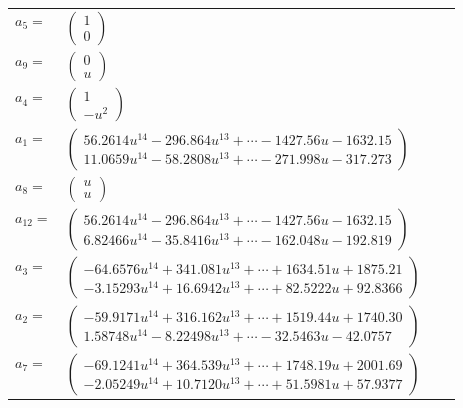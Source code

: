 \documentclass[1p]{elsarticle_modified}
\theoremstyle{definition}
\begin{document}
\begin{tabular}{m{7pt} m{180pt} m{7pt} m{180pt} }
\flushright $a_{5}=$&$\begin{pmatrix}1\\0\end{pmatrix}$ \\
\flushright $a_{9}=$&$\begin{pmatrix}0\\u\end{pmatrix}$ \\
\flushright $a_{4}=$&$\begin{pmatrix}1\\- u^2\end{pmatrix}$ \\
\flushright $a_{1}=$&$\begin{pmatrix}56.2614 u^{14}-296.864 u^{13}+\cdots-1427.56 u-1632.15\\11.0659 u^{14}-58.2808 u^{13}+\cdots-271.998 u-317.273\end{pmatrix}$ \\
\flushright $a_{8}=$&$\begin{pmatrix}u\\u\end{pmatrix}$ \\
\flushright $a_{12}=$&$\begin{pmatrix}56.2614 u^{14}-296.864 u^{13}+\cdots-1427.56 u-1632.15\\6.82466 u^{14}-35.8416 u^{13}+\cdots-162.048 u-192.819\end{pmatrix}$ \\
\flushright $a_{3}=$&$\begin{pmatrix}-64.6576 u^{14}+341.081 u^{13}+\cdots+1634.51 u+1875.21\\-3.15293 u^{14}+16.6942 u^{13}+\cdots+82.5222 u+92.8366\end{pmatrix}$ \\
\flushright $a_{2}=$&$\begin{pmatrix}-59.9171 u^{14}+316.162 u^{13}+\cdots+1519.44 u+1740.30\\1.58748 u^{14}-8.22498 u^{13}+\cdots-32.5463 u-42.0757\end{pmatrix}$ \\
\flushright $a_{7}=$&$\begin{pmatrix}-69.1241 u^{14}+364.539 u^{13}+\cdots+1748.19 u+2001.69\\-2.05249 u^{14}+10.7120 u^{13}+\cdots+51.5981 u+57.9377\end{pmatrix}$ \\

\end{tabular}
\end{document}
